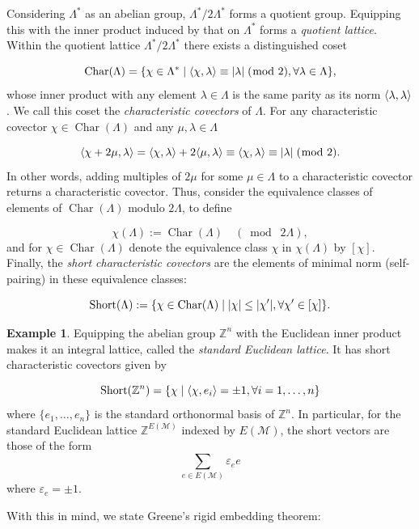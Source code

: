 \documentclass[12pt]{report}
\theoremstyle{definition}
\newtheorem{example}[theorem]{Example}
\DeclareMathOperator{\Char}{Char}
\DeclareMathOperator{\Short}{Short}
\DeclarePairedDelimiter\abs{\lvert}{\rvert}
\DeclarePairedDelimiter\iprod{\langle}{\rangle}
\def\Z{\mathbb Z}
\def\calM{\mathcal M}
\theoremstyle{upright}
\begin{document}
Considering $\Lambda^*$ as an abelian group, $\Lambda^*/2\Lambda^*$ forms a quotient group.
Equipping this with the inner product induced by that on $\Lambda^*$ forms a \textit{quotient lattice}.
Within the quotient lattice $\Lambda^*/2\Lambda^*$ there exists a distinguished coset

\[\Char(\Lambda)=\{\chi\in\Lambda^*\;|\;\iprod*{\chi, \lambda}\equiv\abs*{\lambda}\;(\bmod\;2), \forall\lambda\in\Lambda\},\]
whose inner product with any element $\lambda\in\Lambda$ is the same parity as its norm $\iprod*{\lambda, \lambda}$.
We call this coset the \textit{characteristic covectors} of $\Lambda$.
For any characteristic covector $\chi\in\Char(\Lambda)$ and any $\mu, \lambda\in\Lambda$

\[\iprod*{\chi+2\mu, \lambda}=\iprod*{\chi, \lambda}+2\iprod*{\mu, \lambda}\equiv\iprod*{\chi, \lambda}\equiv\abs*{\lambda}\;(\bmod\;2).\]
In other words, adding multiples of $2\mu$ for some $\mu\in\Lambda$ to a characteristic covector returns a characteristic covector.
Thus, consider the equivalence classes of elements of $\Char(\Lambda)$ modulo $2\Lambda$, to define

\[\chi(\Lambda):=\Char(\Lambda)\quad(\bmod\;2\Lambda),\]
and for $\chi\in\Char(\Lambda)$ denote the equivalence class $\chi$ in $\chi(\Lambda)$ by $[\chi]$.
Finally, the \textit{short characteristic covectors} are the elements of minimal norm (self-pairing) in these equivalence classes:

\[\Short(\Lambda):=\{\chi\in\Char(\Lambda)\;|\;\abs*{\chi}\leq\abs*{\chi'}, \forall\chi'\in[\chi]\}.\]


\begin{example}

    Equipping the abelian group $\Z^n$ with the Euclidean inner product makes it an integral lattice, called the \textit{standard Euclidean lattice}.
    It has short characteristic covectors given by
    
    \[\Short(\Z^n)=\{\chi\;|\;\iprod*{\chi, e_i}=\pm1, \forall i=1, \dots, n\}\]
    where $\{e_1, \dots, e_n\}$ is the standard orthonormal basis of $\Z^n$.
    In particular, for the standard Euclidean lattice $\Z^{E(\calM)}$ indexed by $E(\calM)$, the short vectors are those of the form
    \[\sum_{e\in E(\calM)} \varepsilon_e e\]
    where $\varepsilon_e=\pm1$.

\end{example}

With this in mind, we state Greene's rigid embedding theorem:
\end{document}
